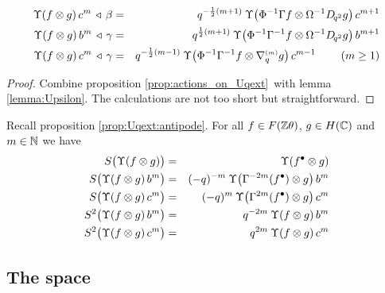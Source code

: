 \begin{prop}
\begin{eqnarray*}
  \\  \vertL
  \Upsilon(f \tens g)\, c^m \, \ract \,\beta
     &=& q^{-\frac{1}{2}(m+1)}\:
         \Upsilon \!\left(\Phi^{-1}\Gamma f \tens \Omega^{-1} \Dqsqr g \vertM\right) c^{m+1}
  \\
  \vertL
  \Upsilon(f \tens g)\, b^m \, \ract \, \gamma
     &=& q^{\frac{1}{2}(m+1)}\:
         \Upsilon \!\left(\Phi^{-1}\Gamma^{-1} f \tens \Omega^{-1} \Dqsqr g \vertM\right) b^{m+1}
  \\ \vertL
  \Upsilon(f \tens g)\, c^m \, \ract \,\gamma
     &=& q^{-\frac{1}{2}(m-1)}\:
         \Upsilon \!\left(\Phi^{-1}\Gamma^{-1} f \tens \nabq{m} g \vertM\right) c^{m-1}
     \hspace{8mm} (m\geq 1)
\end{eqnarray*}
\end{prop}

\begin{proof}
  Combine proposition \ref{prop:actions_on_Uqext}\ with lemma
  \ref{lemma:Upsilon}\@. The calculations are not too short but
  straightforward.
\end{proof}



\begin{prop} \label{prop:UqFG:antipode}
Recall proposition \ref{prop:Uqext:antipode}\@.
For all\/ $f\in F(\mathbb{Z} \theta)$, $g\in H(\mathbb{C})$ and\/ $m \in \mathbb{N}$ we have
\begin{eqnarray*}
   S\! \left(\Upsilon(f \tens g) \vertM\right)
        &=&     \Upsilon(f^\bullet \tens g) \\
   S\! \left(\Upsilon(f \tens g)\, b^m \vertM\right)
        &=&     (-q)^{-m}\: \Upsilon \!\left(\Gamma^{-2m} (f^\bullet) \tens g \vertM\right) b^m \\
   S\! \left(\Upsilon(f \tens g)\, c^m \vertM\right)
        &=&     (-q)^m \: \Upsilon \!\left(\Gamma^{2m} (f^\bullet) \tens g \vertM\right) c^m   \\
   S^2\! \left(\Upsilon(f \tens g)\, b^m \vertM\right)
        &=&   q^{-2m} \: \Upsilon(f \tens g)\, b^m   \\
   S^2\! \left(\Upsilon(f \tens g)\, c^m \vertM\right) &=&  q^{2m} \: \Upsilon(f \tens g)\, c^m
\end{eqnarray*}
\end{prop}



\subsection{The space \protect\UqT} \label{subsect:spaceUqT}

